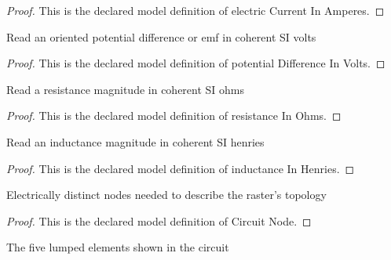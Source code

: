 \begin{proof}
  This is the declared model definition of electric Current In Amperes.
\end{proof}
\begin{definition}
  \label{def:physics:phyx-mini-0985:phyxminiproblems-problemphyxmini0985-potentialdifferenceinvolts}
  Read an oriented potential difference or emf in coherent SI volts
\end{definition}
\begin{proof}
  This is the declared model definition of potential Difference In Volts.
\end{proof}
\begin{definition}
  \label{def:physics:phyx-mini-0985:phyxminiproblems-problemphyxmini0985-resistanceinohms}
  Read a resistance magnitude in coherent SI ohms
\end{definition}
\begin{proof}
  This is the declared model definition of resistance In Ohms.
\end{proof}
\begin{definition}
  \label{def:physics:phyx-mini-0985:phyxminiproblems-problemphyxmini0985-inductanceinhenries}
  Read an inductance magnitude in coherent SI henries
\end{definition}
\begin{proof}
  This is the declared model definition of inductance In Henries.
\end{proof}
\begin{definition}
  \label{def:physics:phyx-mini-0985:phyxminiproblems-problemphyxmini0985-circuitnode}
  Electrically distinct nodes needed to describe the raster's topology
\end{definition}
\begin{proof}
  This is the declared model definition of Circuit Node.
\end{proof}
\begin{definition}
  \label{def:physics:phyx-mini-0985:phyxminiproblems-problemphyxmini0985-circuitelement}
  The five lumped elements shown in the circuit
\end{definition}
